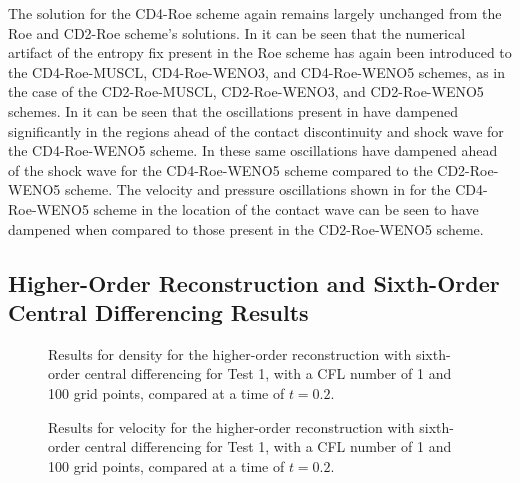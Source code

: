 The solution for the CD4-Roe scheme again remains largely unchanged from the Roe and CD2-Roe scheme's solutions. In  it can be seen that the numerical artifact of the entropy fix present in the Roe scheme has again been introduced to the CD4-Roe-MUSCL, CD4-Roe-WENO3, and CD4-Roe-WENO5 schemes, as in the case of the CD2-Roe-MUSCL, CD2-Roe-WENO3, and CD2-Roe-WENO5 schemes. In  it can be seen that the oscillations present in  have dampened significantly in the regions ahead of the contact discontinuity and shock wave for the CD4-Roe-WENO5 scheme.  In  these same oscillations have dampened ahead of the shock wave for the CD4-Roe-WENO5 scheme compared to the CD2-Roe-WENO5 scheme. The velocity and pressure oscillations shown in  for the CD4-Roe-WENO5 scheme in the location of the contact wave can be seen to have dampened when compared to those present in the CD2-Roe-WENO5 scheme.

\subsection{Higher-Order Reconstruction and Sixth-Order Central Differencing Results}
\begin{figure}
	\caption[Results for density for the higher-order reconstruction with sixth-order central differencing for Test 1, with a CFL number of 1 and 100 grid points, compared at a time of $t=0.2$.]{Results for density for the higher-order reconstruction with sixth-order central differencing for Test 1, with a CFL number of 1 and 100 grid points, compared at a time of $t=0.2$.}
	\label{fig:Test1HORCD6density}
\end{figure}

\begin{figure}
	\caption[Results for velocity for the higher-order reconstruction with sixth-order central differencing for Test 1, with a CFL number of 1 and 100 grid points, compared at a time of $t=0.2$.]{Results for velocity for the higher-order reconstruction with sixth-order central differencing for Test 1, with a CFL number of 1 and 100 grid points, compared at a time of $t=0.2$.}
	\label{fig:Test1HORCD6velocity}
\end{figure}

